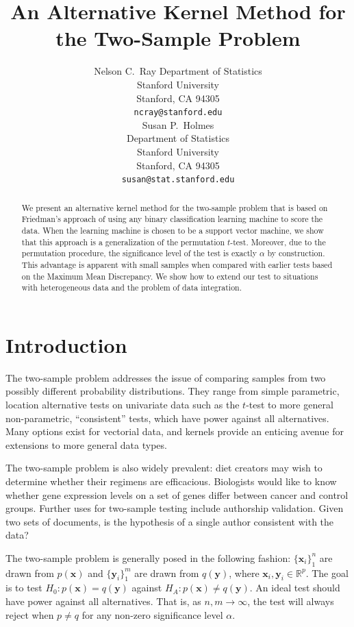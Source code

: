 \documentclass{article} %
\title{An Alternative Kernel Method for the Two-Sample Problem}
\author{
Nelson C.~Ray%
Department of Statistics\\
Stanford University\\
Stanford, CA 94305 \\
\texttt{ncray@stanford.edu} \\
\And
Susan P.~Holmes \\
Department of Statistics\\
Stanford University\\
Stanford, CA 94305 \\
\texttt{susan@stat.stanford.edu} \\
}
\theoremstyle{remark}
\begin{document}
\maketitle

\begin{abstract}
We present an alternative kernel method for the two-sample problem
that is based on Friedman's approach of using any binary
classification learning machine to score the data.  When the learning
machine is chosen to be a support vector machine, we show that this
approach is a generalization of the permutation $t$-test.  Moreover, due
to the permutation procedure, the significance level of the test is
exactly $\alpha$ by construction.  This advantage is apparent with small
samples when compared with earlier tests based on the Maximum Mean
Discrepancy.  We show how to extend our test to situations with
heterogeneous data and the problem of data integration.
\end{abstract}

\section{Introduction}
The two-sample problem addresses the issue of comparing samples from
two possibly different probability distributions.  They range from
simple parametric, location alternative tests on univariate data such as the
$t$-test to more general non-parametric, ``consistent'' tests, which
have power against all alternatives.  Many options exist for vectorial
data, and kernels provide an enticing avenue for extensions to more
general data types.  

The two-sample problem is also widely prevalent: diet creators may
wish to determine whether their regimens are efficacious.  Biologists
would like to know whether gene expression levels on a set of genes
differ between cancer and control groups.  Further uses for two-sample
testing include authorship validation.  Given two sets of documents,
is the hypothesis of a single author consistent with the data?  

The two-sample problem is generally posed in the following fashion: $\{
\mathbf{x}_i\}_1^n$ are drawn from $p(\mathbf{x})$ and
$\{\mathbf{y}_i\}_1^m$ are drawn from $q(\mathbf{y})$, where $\mathbf{x}_i,
\mathbf{y}_i \in \mathbb{R}^p$. The goal is to test $H_0:
p(\mathbf{x}) = q(\mathbf{y})$ against $H_A: p(\mathbf{x}) \neq
q(\mathbf{y})$. An ideal test should have power against all
alternatives. That is, as $n,m \to \infty$, the test
will always reject when $p \neq q$ for any non-zero significance level
$\alpha$. 
\end{document}
